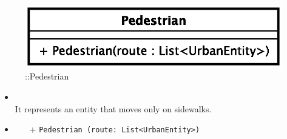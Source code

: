 \begin{figure}[h]
\centering
\includegraphics[scale=0.6,keepaspectratio]{images/solution/app/backend/pedestrian.eps}
\caption{\pActive::Pedestrian}
\label{fig:sd-app-pedestrian}
\end{figure}
\FloatBarrier
\begin{itemize}
  \item \textbf{\descr} \\
It represents an entity that moves only on sidewalks.
\item \textbf{\ops}
  \begin{itemize}
    \item[+] \texttt{Pedestrian (route: List<UrbanEntity>)}
  \end{itemize}
\end{itemize} 
